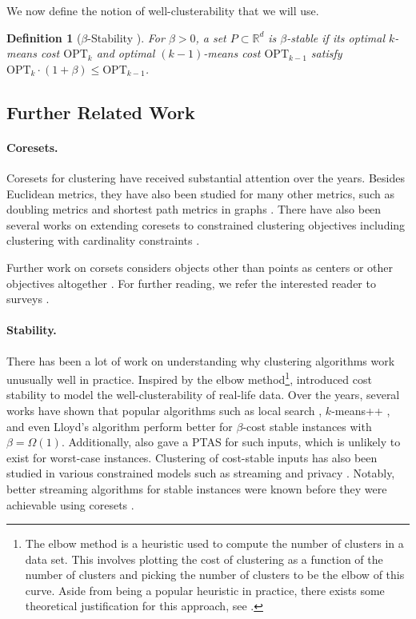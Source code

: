 \documentclass[11pt]{article}
\newtheorem{definition}[lemma]{Definition}
\theoremstyle{restate}
\theoremstyle{definition}
\newcommand{\R}{\ensuremath{\mathbb{R}}}
\begin{document}
We now define the notion of well-clusterability that we will use.
 \begin{definition}[$\beta$-Stability \cite{ORSS12}]\label{def: stability}
    For $\beta > 0$, a set $P \subset \R^d$ is $\beta$-stable if its optimal $k$-means cost $\mathrm{OPT}_k$ and optimal $(k-1)$-means cost $\mathrm{OPT}_{k-1}$  satisfy $\mathrm{OPT}_k\cdot (1+\beta) \leq \mathrm{OPT}_{k-1}$.
\end{definition}


\subsection{Further Related Work}
\label{sec:related-work}
\paragraph{Coresets.}
Coresets for clustering have received substantial attention over the years. 
Besides Euclidean metrics, they have also been studied for many other metrics, such as doubling metrics \cite{HuangJLW18,Cohen-AddadSS21} and shortest path metrics in graphs \cite{BakerBHJK020,BravermanJKW21}.
There have also been several works on extending coresets to constrained clustering objectives including clustering with cardinality constraints \cite{Cohen-AddadL19,HuangJV19,SSS19, BFS21,BravermanCJKST022}.

Further work on corsets considers objects other than points as centers \cite{FeldmanMSW10,HuangSV21,BJKW21} or other objectives altogether 
\cite{BoutsidisDM13,MK18,MunteanuSSW18,KarninL19,PhillipsT20,
TukanMF20,HuangSV20,MaiMR21}.
For further reading, we refer the interested reader to surveys \cite{Feldman20,MunteanuS18}.

\paragraph{Stability.} There has been a lot of work on understanding why clustering algorithms work unusually well in practice. Inspired by the elbow method\footnote{The elbow method is a heuristic used to compute the number of clusters in a data set. This involves plotting the cost of clustering 
 as a function of the number of clusters and picking the number of clusters to be the elbow of this curve.  Aside from being a popular heuristic in practice, there exists some theoretical justification for this approach, see \cite{BhattacharyyaKK22}.}, \cite{ORSS12} introduced cost stability to model the well-clusterability of real-life data.  Over the years, several works have shown that popular algorithms such as local search \cite{Cohen-AddadS17}, $k$-means++ \cite{JaG12, AgarwalJP15}, and even Lloyd's algorithm \cite{KuK10, AwS12} perform better for $\beta$-cost stable instances with $\beta= \Omega(1)$. Additionally, 
\cite{ABS10} also gave a PTAS for such inputs, which is unlikely to exist for worst-case instances. Clustering of cost-stable inputs has also been studied in various constrained models such as streaming and privacy \cite{ShechnerSS20}. Notably, better streaming algorithms for stable instances were known \cite{BMORST11} before they were achievable using coresets \cite{BravermanFLR19,CWZ23}. 
\end{document}
